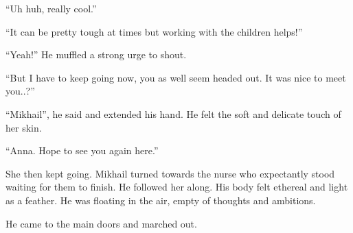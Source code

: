 “Uh huh, really cool.”

“It can be pretty tough at times but working with the children helps!”

“Yeah!” He muffled a strong urge to shout.

“But I have to keep going now, you as well seem headed out. It was nice to meet you..?”

“Mikhail”, he said and extended his hand. He felt the soft and delicate touch of her skin.

“Anna. Hope to see you again here.”

She then kept going. Mikhail turned towards the nurse who expectantly stood waiting for them to finish. He followed her along. His body felt ethereal and light as a feather. He was floating in the air, empty of thoughts and ambitions.

He came to the main doors and marched out.
